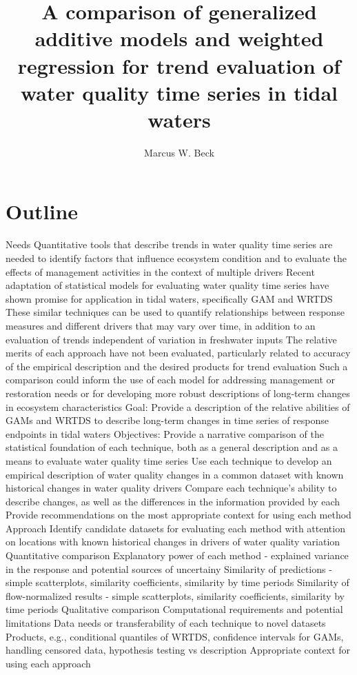 \documentclass[letterpaper,12pt]{article}\usepackage[]{graphicx}\usepackage[]{color}
\begin{document}
\setlength{\parskip}{5mm}
\setlength{\parindent}{0in}

\title{A comparison of generalized additive models and weighted regression for trend evaluation of water quality time series in tidal waters}
\author{Marcus W. Beck}
\maketitle

\section{Outline}
\begin{outline}
\1 Needs
\2 Quantitative tools that describe trends in water quality time series are needed to identify factors that influence ecosystem condition and to evaluate the effects of management activities in the context of multiple drivers
\2 Recent adaptation of statistical models for evaluating water quality time series have shown promise for application in tidal waters, specifically \ac{GAM} and \ac{WRTDS}
\2 These similar techniques can be used to quantify relationships between response measures and different drivers that may vary over time, in addition to an evaluation of trends independent of variation in freshwater inputs
\2 The relative merits of each approach have not been evaluated, particularly related to accuracy of the empirical description and the desired products for trend evaluation
\2 Such a comparison could inform the use of each model for addressing management or restoration needs or for developing more robust descriptions of long-term changes in ecosystem characteristics
\1 Goal: Provide a description of the relative abilities of \acp{GAM} and \ac{WRTDS} to describe long-term changes in time series of response endpoints in tidal waters
\1 Objectives:
\2 Provide a narrative comparison of the statistical foundation of each technique, both as a general description and as a means to evaluate water quality time series
\2 Use each technique to develop an empirical description of water quality changes in a common dataset with known historical changes in water quality drivers
\2 Compare each technique's ability to describe changes, as well as the differences in the information provided by each
\2 Provide recommendations on the most appropriate context for using each method
\1 Approach
\2 Identify candidate datasets for evaluating each method with attention on locations with known historical changes in drivers of water quality variation
\2 Quantitative comparison
\3 Explanatory power of each method - explained variance in the response and potential sources of uncertainy
\3 Similarity of predictions - simple scatterplots, similarity coefficients, similarity by time periods
\3 Similarity of flow-normalized results - simple scatterplots, similarity coefficients, similarity by time periods
\2 Qualitative comparison
\3 Computational requirements and potential limitations
\3 Data needs or transferability of each technique to novel datasets
\3 Products, e.g., conditional quantiles of \ac{WRTDS}, confidence intervals for \acp{GAM}, handling censored data, hypothesis testing vs description
\3 Appropriate context for using each approach
\end{outline}
\end{document}
